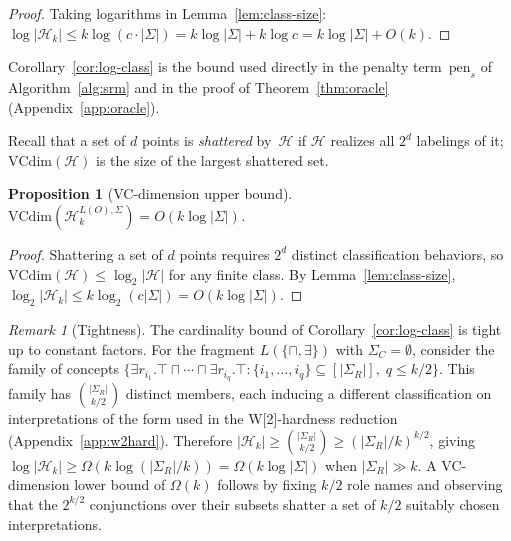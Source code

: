 \documentclass[accepted]{uai2026} %
\newtheorem{proposition}[theorem]{Proposition}
\theoremstyle{definition}
\theoremstyle{remark}
\newtheorem{remark}[theorem]{Remark}
\newcommand{\VCdim}{\mathrm{VCdim}}
\begin{document}
\begin{proof}
  Taking logarithms in Lemma~\ref{lem:class-size}:
  $\log|\mathcal{H}_k| \leq k \log(c \cdot |\Sigma|)
  = k \log|\Sigma| + k \log c = k \log|\Sigma| + O(k)$.
\end{proof}

Corollary~\ref{cor:log-class} is the bound
used directly in the penalty term~$\mathrm{pen}_s$ of
Algorithm~\ref{alg:srm} and in the proof of
Theorem~\ref{thm:oracle} (Appendix~\ref{app:oracle}).

Recall that a set of $d$ points is
\emph{shattered} by~$\mathcal{H}$ if $\mathcal{H}$ realizes all
$2^d$ labelings of it; $\VCdim(\mathcal{H})$ is the size of the
largest shattered set.

\begin{proposition}[VC-dimension upper bound]\label{prop:vcdim}
  $\VCdim(\mathcal{H}_k^{L(O),\Sigma})
  = O(k \log|\Sigma|)$.
\end{proposition}

\begin{proof}
  Shattering a set of $d$ points requires
  $2^d$ distinct classification behaviors, so
  $\VCdim(\mathcal{H}) \leq \log_2 |\mathcal{H}|$ for any finite
  class. By Lemma~\ref{lem:class-size},
  $\log_2|\mathcal{H}_k| \leq k \log_2(c|\Sigma|)
  = O(k \log|\Sigma|)$.
\end{proof}

\begin{remark}[Tightness]\label{rem:tight}
  The cardinality bound of
  Corollary~\ref{cor:log-class} is tight up to constant factors.
  For the fragment $L(\{\sqcap, \exists\})$ with
  $\Sigma_C = \emptyset$, consider the family of concepts
  $\{\exists r_{i_1}.\top \sqcap \cdots \sqcap
  \exists r_{i_q}.\top : \{i_1, \ldots, i_q\} \subseteq [|\Sigma_R|],\;
  q \leq k/2\}$.
  This family has $\binom{|\Sigma_R|}{k/2}$ distinct members,
  each inducing a different classification on interpretations
  of the form used in the W[2]-hardness reduction
  (Appendix~\ref{app:w2hard}).  Therefore
  $|\mathcal{H}_k| \geq \binom{|\Sigma_R|}{k/2}
  \geq (|\Sigma_R|/k)^{k/2}$, giving
  $\log|\mathcal{H}_k| \geq \Omega(k \log(|\Sigma_R|/k))
  = \Omega(k \log|\Sigma|)$ when $|\Sigma_R| \gg k$.
  A VC-dimension lower bound of $\Omega(k)$
  follows by fixing $k/2$ role names and observing that the
  $2^{k/2}$ conjunctions over their subsets shatter a set of
  $k/2$ suitably chosen interpretations.
\end{remark}

\end{document}
